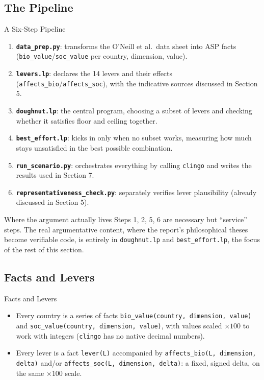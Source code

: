 \documentclass[11pt,aspectratio=169]{beamer}
\begin{document}
\subsection{The Pipeline}
\begin{frame}{A Six-Step Pipeline}
  \footnotesize
  \begin{enumerate}
    \item \textbf{\texttt{data\_prep.py}}: transforms the O'Neill et al.\ data sheet into ASP facts (\texttt{bio\_value}/\texttt{soc\_value} per country, dimension, value).
    \item \textbf{\texttt{levers.lp}}: declares the 14 levers and their effects (\texttt{affects\_bio}/\texttt{affects\_soc}), with the indicative sources discussed in Section 5.
    \item \textbf{\texttt{doughnut.lp}}: the central program, choosing a subset of levers and checking whether it satisfies floor and ceiling together.
    \item \textbf{\texttt{best\_effort.lp}}: kicks in only when no subset works, measuring how much stays unsatisfied in the best possible combination.
    \item \textbf{\texttt{run\_scenario.py}}: orchestrates everything by calling \texttt{clingo} and writes the results used in Section 7.
    \item \textbf{\texttt{representativeness\_check.py}}: separately verifies lever plausibility (already discussed in Section 5).
  \end{enumerate}
  \begin{alertblock}{Where the argument actually lives}
    Steps 1, 2, 5, 6 are necessary but ``service'' steps. The real argumentative content, where the report's philosophical theses become verifiable code, is entirely in \texttt{doughnut.lp} and \texttt{best\_effort.lp}, the focus of the rest of this section.
  \end{alertblock}
\end{frame}

\subsection{Facts and Levers}
\begin{frame}{Facts and Levers}
  \begin{itemize}
    \item Every country is a series of facts \texttt{bio\_value(country, dimension, value)} and \texttt{soc\_value(country, dimension, value)}, with values scaled $\times 100$ to work with integers (\texttt{clingo} has no native decimal numbers).
    \item Every lever is a fact \texttt{lever(L)} accompanied by \texttt{affects\_bio(L, dimension, delta)} and/or \texttt{affects\_soc(L, dimension, delta)}: a fixed, signed delta, on the same $\times 100$ scale.
  \end{itemize}
\end{frame}
\end{document}
